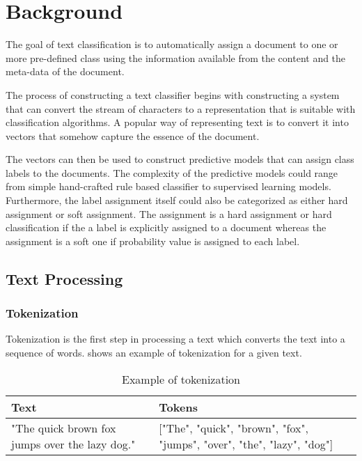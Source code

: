 \chapter{Background} \label{background}
The goal of text classification is to automatically assign a document to one or more pre-defined class using the information available from the content and the meta-data of the document.

The process of constructing a text classifier begins with constructing a system that can convert the stream of characters to a representation that is suitable with classification algorithms. A popular way of representing text is to convert it into vectors that somehow capture the essence of the document. 

The vectors can then be used to construct predictive models that can assign class labels to the documents. The complexity of the predictive models could range from simple hand-crafted rule based classifier to supervised learning models. Furthermore, the label assignment itself could also be categorized as either hard assignment or soft assignment. The assignment is a hard assignment or hard classification if the a label is explicitly assigned to a document whereas the assignment is a soft one if probability value is assigned to each label.

\section{Text Processing}
\subsection{Tokenization}
Tokenization is the first step in processing a text which converts the text into a sequence of words.  shows an example of tokenization for a given text.

\begin{table}[h]
\begin{center}
\caption{Example of tokenization}
\label{tbl:tokenization_example}
\begin{tabular}{p{6cm}p{6cm}}
\toprule 
Text&Tokens\\
\midrule 
"The quick brown fox jumps over the lazy dog."&["The", "quick", "brown", "fox", "jumps", "over", "the", "lazy", "dog"]\\
\bottomrule
\end{tabular}
\end{center}
\end{table}

